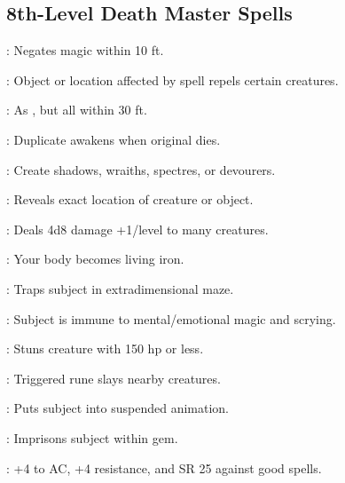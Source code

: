 \begin{multicols}{2}
\subsection{8th-Level Death Master Spells}
\begin{description*}
\item[\linkspell{Antimagic Field}:] Negates magic within 10 ft.
\item[\linkspell{Antipathy}:] Object or location affected by spell repels certain creatures.
\item[\linkspell{Charm Monster, Mass}:] As , but all within 30 ft.
\item[\linkspell{Clone}:] Duplicate awakens when original dies.
\item[\linkspell{Create Greater Undead}:] Create shadows, wraiths, spectres, or devourers.
\item[\linkspell{Discern Location}:] Reveals exact location of creature or object.
\item[\linkspell{Inflict Critical Wounds, Mass}:] Deals 4d8 damage +1/level to many creatures.
\item[\linkspell{Iron Body}:] Your body becomes living iron.
\item[\linkspell{Maze}:] Traps subject in extradimensional maze.
\item[\linkspell{Mind Blank}:] Subject is immune to mental/emotional magic and scrying.
\item[\linkspell{Power Word Stun}:] Stuns creature with 150 hp or less.
\item[\linkspell{Symbol of Death}:] Triggered rune slays nearby creatures.
\item[\linkspell{Temporal Stasis}:] Puts subject into suspended animation.
\item[\linkspell{Trap the Soul}:] Imprisons subject within gem.
\item[\linkspell{Unholy Aura}:] +4 to AC, +4 resistance, and SR 25 against good spells.
\end{description*}


\end{multicols}
